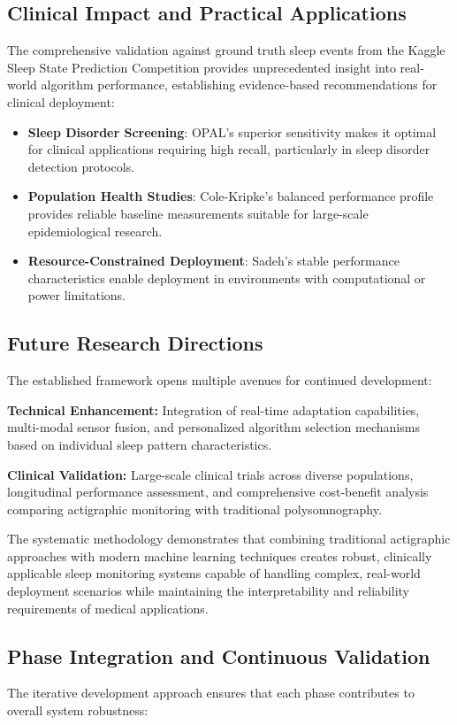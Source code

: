 \documentclass[conference]{IEEEtran}
\begin{document}
\subsection{Clinical Impact and Practical Applications}
The comprehensive validation against ground truth sleep events from the Kaggle Sleep State Prediction Competition provides unprecedented insight into real-world algorithm performance, establishing evidence-based recommendations for clinical deployment:

\begin{itemize}
    \item \textbf{Sleep Disorder Screening}: OPAL's superior sensitivity makes it optimal for clinical applications requiring high recall, particularly in sleep disorder detection protocols.
    \item \textbf{Population Health Studies}: Cole-Kripke's balanced performance profile provides reliable baseline measurements suitable for large-scale epidemiological research.
    \item \textbf{Resource-Constrained Deployment}: Sadeh's stable performance characteristics enable deployment in environments with computational or power limitations.
\end{itemize}

\subsection{Future Research Directions}
The established framework opens multiple avenues for continued development:

\textbf{Technical Enhancement:} Integration of real-time adaptation capabilities, multi-modal sensor fusion, and personalized algorithm selection mechanisms based on individual sleep pattern characteristics.

\textbf{Clinical Validation:} Large-scale clinical trials across diverse populations, longitudinal performance assessment, and comprehensive cost-benefit analysis comparing actigraphic monitoring with traditional polysomnography.

The systematic methodology demonstrates that combining traditional actigraphic approaches with modern machine learning techniques creates robust, clinically applicable sleep monitoring systems capable of handling complex, real-world deployment scenarios while maintaining the interpretability and reliability requirements of medical applications.

\subsection{Phase Integration and Continuous Validation}
The iterative development approach ensures that each phase contributes to overall system robustness:
\end{document}
